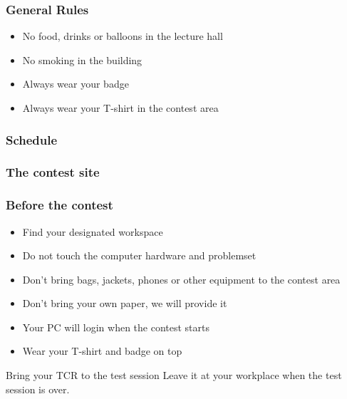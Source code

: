 \documentclass[t]{beamer}
\begin{document}
\begin{frame}
	\frametitle{General Rules}
	\begin{itemize}
		\item No food, drinks or balloons in the lecture hall
		\item No smoking in the building
		\item Always wear your badge
		\item Always wear your T-shirt in the contest area
	\end{itemize}
\end{frame}
{}
\begin{frame}
	\frametitle{Schedule}
	\tableofcontents
\end{frame}
\begin{frame}[c]
	\frametitle{The contest site}
	\begin{pgfpicture}
	\end{pgfpicture}
\end{frame}
\begin{frame}
	\frametitle{Before the contest}
	\begin{itemize}
		\item Find your designated workspace
		\item Do not touch the computer hardware and problemset
		\item Don't bring bags, jackets, phones or other equipment to the contest area
		\item Don't bring your own paper, we will provide it
		\item Your PC will login when the contest starts
		\item Wear your T-shirt and badge on top
	\end{itemize}
	\begin{block}
		{Bring your TCR to the test session}
		Leave it at your workplace when the test session is over.
	\end{block}
\end{frame}
\end{document}
